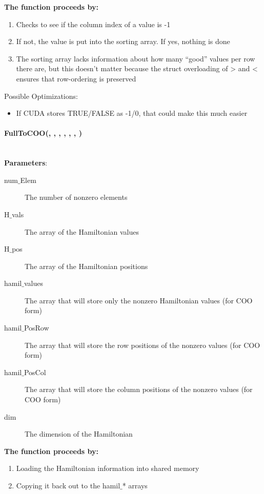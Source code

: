 \documentclass{article}
\begin{document}
\noindent\textbf{The function proceeds by:}
\begin{enumerate}
\item{Checks to see if the column index of a value is -1}
\item{If not, the value is put into the sorting array. If yes, nothing is done}
\item{The sorting array lacks information about how many ``good'' values per row there are, but this doesn't matter because the struct overloading of > and < ensures that row-ordering is preserved }
\end{enumerate}

Possible Optimizations:
\begin{itemize}
\item{If CUDA stores TRUE/FALSE as -1/0, that could make this much easier}
\end{itemize}


\paragraph{\cudaglobal \void FullToCOO(\int , \cuDoubleComplex , \typelongtwoptr , \cuDoubleComplex , \typelongptr , \typelongptr, \long) \\ \\}
\noindent\textbf{Parameters}:
\begin{description}
\item[\int num$\_$Elem] The number of nonzero elements
\item[\cuDoubleComplex H$\_$vals] The array of the Hamiltonian values
\item[\typelongtwoptr H$\_$pos] The array of the Hamiltonian positions
\item[\cuDoubleComplex hamil$\_$values] The array that will store only the nonzero Hamiltonian values (for COO form)
\item[\typelongptr hamil$\_$PosRow] The array that will store the row positions of the nonzero values (for COO form)
\item[\typelongptr hamil$\_$PosCol] The array that will store the column positions of the nonzero values (for COO form)
\item[\long dim] The dimension of the Hamiltonian

\end{description}

\noindent\textbf{The function proceeds by:}
\begin{enumerate}
\item{Loading the Hamiltonian information into shared memory}
\item{Copying it back out to the hamil$\_$* arrays}
\end{enumerate}
\end{document}
